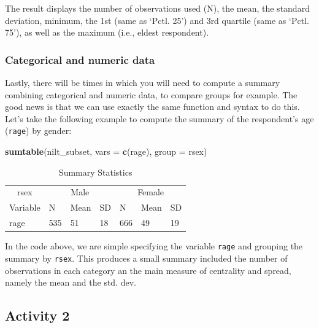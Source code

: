 \documentclass[
]{book}
\newenvironment{Shaded}{\begin{snugshade}}{\end{snugshade}}
\newcommand{\AttributeTok}[1]{\textcolor[rgb]{0.13,0.29,0.53}{#1}}
\newcommand{\FunctionTok}[1]{\textcolor[rgb]{0.13,0.29,0.53}{\textbf{#1}}}
\newcommand{\NormalTok}[1]{#1}
\newcommand{\StringTok}[1]{\textcolor[rgb]{0.31,0.60,0.02}{#1}}
\begin{document}
The result displays the number of observations used (N), the mean, the standard deviation, minimum, the 1st (same as `Pctl. 25') and 3rd quartile (same as `Pctl. 75'), as well as the maximum (i.e., eldest respondent).

\hypertarget{categorical-and-numeric-data}{%
\subsubsection{Categorical and numeric data}\label{categorical-and-numeric-data}}

Lastly, there will be times in which you will need to compute a summary combining categorical and numeric data, to compare groups for example. The good news is that we can use exactly the same function and syntax to do this. Let's take the following example to compute the summary of the respondent's age (\texttt{rage}) by gender:

\begin{Shaded}
\begin{Highlighting}[]
\FunctionTok{sumtable}\NormalTok{(nilt\_subset, }\AttributeTok{vars =} \FunctionTok{c}\NormalTok{(}\StringTok{\textquotesingle{}rage\textquotesingle{}}\NormalTok{), }\AttributeTok{group =} \StringTok{\textquotesingle{}rsex\textquotesingle{}}\NormalTok{)}
\end{Highlighting}
\end{Shaded}

\begin{table}

\caption{\label{tab:unnamed-chunk-60}Summary Statistics}
\centering
\begin{tabular}[t]{lllllll}
\toprule
\multicolumn{1}{c}{rsex} & \multicolumn{3}{c}{Male} & \multicolumn{3}{c}{Female} \\
\cmidrule(l{3pt}r{3pt}){1-1} \cmidrule(l{3pt}r{3pt}){2-4} \cmidrule(l{3pt}r{3pt}){5-7}
Variable & N & Mean & SD & N & Mean & SD\\
\midrule
rage & 535 & 51 & 18 & 666 & 49 & 19\\
\bottomrule
\end{tabular}
\end{table}

In the code above, we are simple specifying the variable \texttt{rage} and grouping the summary by \texttt{rsex}. This produces a small summary included the number of observations in each category an the main measure of centrality and spread, namely the mean and the std. dev.

\hypertarget{activity-2-1}{%
\subsection{Activity 2}\label{activity-2-1}}
\end{document}
